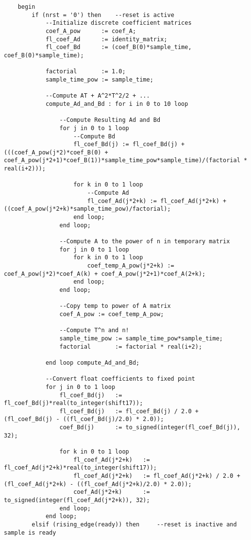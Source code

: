 \begin{lstlisting}
    begin
        if (nrst = '0') then    --reset is active
            --Initialize discrete coefficient matrices
            coef_A_pow      := coef_A;
            fl_coef_Ad      := identity_matrix;
            fl_coef_Bd      := (coef_B(0)*sample_time, coef_B(0)*sample_time);

            factorial       := 1.0;
            sample_time_pow := sample_time;

            --Compute AT + A^2*T^2/2 + ...
            compute_Ad_and_Bd : for i in 0 to 10 loop

                --Compute Resulting Ad and Bd
                for j in 0 to 1 loop
                    --Compute Bd
                    fl_coef_Bd(j) := fl_coef_Bd(j) + (((coef_A_pow(j*2)*coef_B(0) + coef_A_pow(j*2+1)*coef_B(1))*sample_time_pow*sample_time)/(factorial * real(i+2)));

                    for k in 0 to 1 loop
                        --Compute Ad
                        fl_coef_Ad(j*2+k) := fl_coef_Ad(j*2+k) + ((coef_A_pow(j*2+k)*sample_time_pow)/factorial);
                    end loop;
                end loop;

                --Compute A to the power of n in temporary matrix 
                for j in 0 to 1 loop
                    for k in 0 to 1 loop
                        coef_temp_A_pow(j*2+k) := coef_A_pow(j*2)*coef_A(k) + coef_A_pow(j*2+1)*coef_A(2+k);
                    end loop;
                end loop;

                --Copy temp to power of A matrix
                coef_A_pow := coef_temp_A_pow;

                --Compute T^n and n!
                sample_time_pow := sample_time_pow*sample_time;
                factorial       := factorial * real(i+2);

            end loop compute_Ad_and_Bd;

            --Convert float coefficients to fixed point
            for j in 0 to 1 loop
                fl_coef_Bd(j)   := fl_coef_Bd(j)*real(to_integer(shift17));
                fl_coef_Bd(j)   := fl_coef_Bd(j) / 2.0 + (fl_coef_Bd(j) - ((fl_coef_Bd(j)/2.0) * 2.0));
                coef_Bd(j)      := to_signed(integer(fl_coef_Bd(j)), 32);

                for k in 0 to 1 loop 
                    fl_coef_Ad(j*2+k)   := fl_coef_Ad(j*2+k)*real(to_integer(shift17));
                    fl_coef_Ad(j*2+k)   := fl_coef_Ad(j*2+k) / 2.0 + (fl_coef_Ad(j*2+k) - ((fl_coef_Ad(j*2+k)/2.0) * 2.0));
                    coef_Ad(j*2+k)      := to_signed(integer(fl_coef_Ad(j*2+k)), 32);
                end loop;
            end loop;
        elsif (rising_edge(ready)) then     --reset is inactive and sample is ready


\end{lstlisting}
